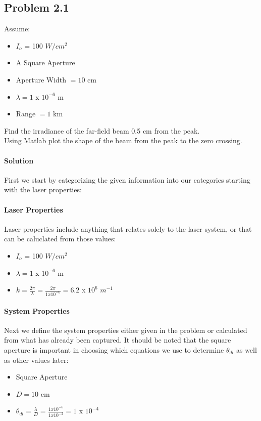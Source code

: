 \documentclass[]{article}
\begin{document}
\subsection{Problem 2.1}
Assume: 
\begin{itemize}
\item $I_{o}$ = 100 $W/cm^2$
\item A Square Aperture
\item Aperture Width $= 10$ cm
\item $\lambda = 1$ x $10^{-6}$ m
\item Range $= 1 $ km
\end{itemize}
Find the irradiance of the far-field beam 0.5 cm from the peak.\\
Using Matlab plot the shape of the beam from the peak to the zero crossing.

\paragraph{Solution}
First we start by categorizing the given information into our categories starting with the laser properties:

\paragraph{Laser Properties}
Laser properties include anything that relates solely to the laser system, or that can be caluclated from those values:
\begin{itemize}
\item $I_{o}$ = 100 $W/cm^2$ 
\item $\lambda = 1$ x $10^{-6}$ m
\item $k = \frac{2 \pi}{\lambda} = \frac{2 \pi}{1 x 10^{-6}} = 6.2$ x $10^{6}$ $m^{-1}$
\end{itemize}

\paragraph{System Properties}
Next we define the system properties either given in the problem or calculated from what has already been captured.  It should be noted that the square aperture is important in choosing which equations we use to determine $\theta_{dl}$ as well as other values later:
\begin{itemize}
\item Square Aperture
\item $D = 10$ cm
\item $\theta_{dl} = \frac{\lambda}{D} = \frac{1 x 10^{-6}}{1 x 10^{-2}} = 1$ x $10^{-4}$
\end{itemize}
\end{document}
